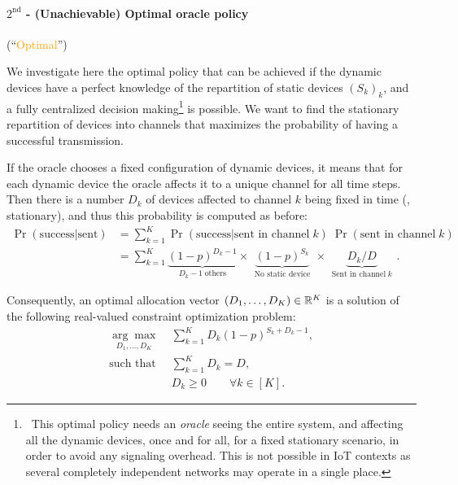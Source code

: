 \paragraph{$2^{\text{nd}}$ - (Unachievable) Optimal oracle policy} (``\textcolor{orange}{Optimal}'')

We investigate here the optimal policy that can be achieved if the dynamic devices have a perfect knowledge of the repartition of static devices $(S_k)_k$, and a fully centralized decision making\footnote{~This optimal policy needs an \emph{oracle} seeing the entire system, and affecting all the dynamic devices, once and for all, for a fixed stationary scenario, in order to avoid any signaling overhead. This is not possible in IoT contexts as several completely independent networks may operate in a single place.} is possible.
We want to find the stationary repartition of devices into channels that maximizes the probability of having a successful transmission.

If the oracle chooses a fixed configuration of dynamic devices, it means that for each dynamic device the oracle affects it to a unique channel for all time steps.
Then there is a number $D_k$ of devices affected to channel $k$ being fixed in time (\ie, stationary),
and thus this probability is computed as before:
%
\begin{align}\label{eq:41:prob_col}
    \Pr(\text{success}|\text{sent})
    & = \sum_{k=1}^{K} \Pr(\text{success}|\text{sent in channel}\;k) \; \Pr(\text{sent in channel}\;k) \nonumber \\
    & = \sum_{k=1}^{K} \underbrace{(1 - p)^{D_k - 1}}_{\;\;D_k - 1 \;\text{others}\;\;} \times \underbrace{(1 - p)^{S_k}}_{\;\;\text{No static device}\;\;} \times \underbrace{ D_k / D }_{\;\;\text{Sent in channel}\; k\;\;}.
\end{align}

Consequently, an optimal allocation vector $(D_1,\dots,D_{K}) \in \mathbb{R}^K$
is a solution of the following real-valued constraint optimization problem:
%
\begin{subequations}\label{eq:41:prob}
\begin{align}
    \underset{D_1,\dots,D_{K}}{\arg\max}\; & \sum_{k=1}^{K} D_k (1 - p)^{S_k + D_k -1}, \label{eq:41:optPb}\\
    \text{such that}\;\; & \sum_{k=1}^{K} D_k = D, \label{eq:41:eqCstr}\\
    & D_k \geq 0 \qquad \forall k\in [K]. \label{eq:41:ineqCstr}
\end{align}
\end{subequations}

